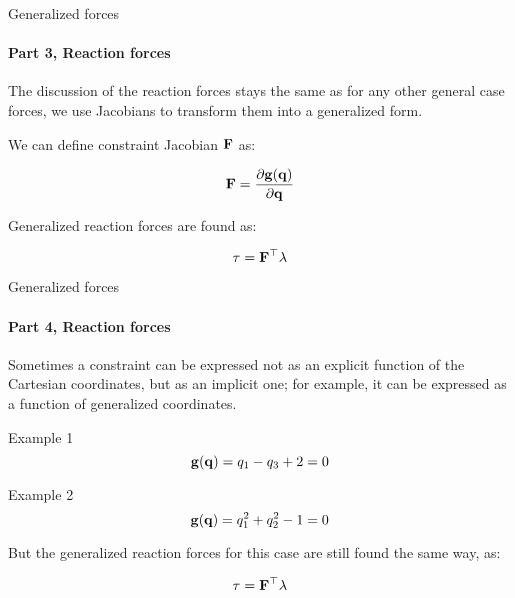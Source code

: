 \documentclass{beamer}
\begin{document}
\begin{frame}{Generalized forces}
\framesubtitle{Part 3, Reaction forces}
\begin{flushleft}

The discussion of the reaction forces stays the same as for any other general case forces, we use Jacobians to transform them into a generalized form. 

\bigskip

We can define constraint Jacobian $\mathbf{F}$ as:

\begin{equation}
    \mathbf{F} = \frac{\partial \mathbf{g}(\mathbf{q}) }{\partial \mathbf{q}}
\end{equation}

Generalized reaction forces are found as:

\begin{equation}
    \tau = \mathbf{F}^\top \lambda
\end{equation}

\end{flushleft}
\end{frame}




\begin{frame}{Generalized forces}
\framesubtitle{Part 4, Reaction forces}
\begin{flushleft}

Sometimes a constraint can be expressed not as an explicit function of the Cartesian coordinates, but as an implicit one; for example, it can be expressed as a function of generalized coordinates.

\begin{exampleblock}{Example 1}
\[
\mathbf{g}(\mathbf{q}) = q_1 - q_3 + 2 = 0
\]
\end{exampleblock}

\begin{exampleblock}{Example 2}
\[
\mathbf{g}(\mathbf{q}) = q^2_1 + q^2_2 - 1 = 0
\]
\end{exampleblock}

But the generalized reaction forces for this case are still found the same way, as:

\begin{equation}
    \tau = \mathbf{F}^\top \lambda
\end{equation}


\end{flushleft}
\end{frame}
\end{document}
